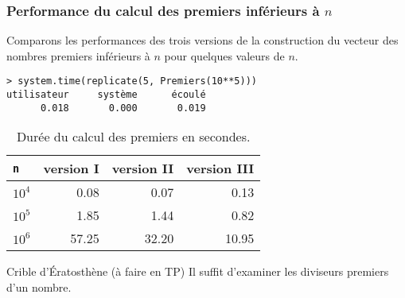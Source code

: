 \documentclass[10pt]{beamer}
\begin{document}
\begin{frame}[fragile]
  \frametitle{Performance du calcul des premiers inférieurs à $n$ }

  Comparons les performances des trois versions de la construction du vecteur des nombres premiers inférieurs à $n$ pour quelques valeurs de $n$.

  \begin{lstlisting}
> system.time(replicate(5, Premiers(10**5)))
utilisateur     système      écoulé 
      0.018       0.000       0.019     
  \end{lstlisting}

  \begin{table}[ht]
    \centering
    \begin{tabular}{l|rrr}
      \toprule
      \texttt{n} & version I & version II & version III \\
      \midrule
      $10^4$     & 0.08      & 0.07       & 0.13        \\
      $10^5$     & 1.85      & 1.44       & 0.82        \\
      $10^6$     & 57.25     & 32.20      & 10.95       \\
      \bottomrule
    \end{tabular}
    \caption{Durée du calcul des premiers en secondes.}
  \end{table}

  \begin{exampleblock}{Crible d'Ératosthène (à faire en TP)}
    Il suffit d'examiner les diviseurs premiers d'un nombre.
  \end{exampleblock}
\end{frame}


\questionSlide

 \appendix
 \backupSlides







\end{document}
